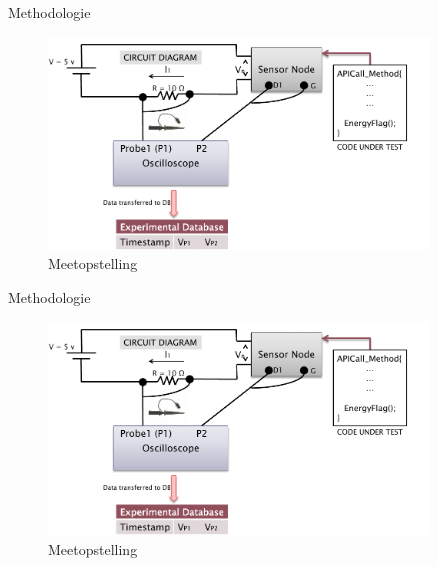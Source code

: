 \documentclass[presentation, bigger]{beamer}
\begin{document}
\begin{frame}{Methodologie}
  \begin{figure}[center]
    \centering
    \includegraphics[width=0.9\textwidth,keepaspectration=true]{elek/diag1}
    \caption{Meetopstelling}
  \end{figure}
\end{frame}

\begin{frame}{Methodologie}
  \begin{figure}[center]
    \centering
    \includegraphics[width=0.9\textwidth,keepaspectration=true]{elek/diag1}
    \caption{Meetopstelling}
  \end{figure}
\end{frame}
\end{document}
